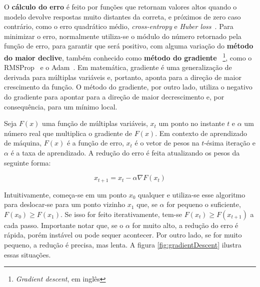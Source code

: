 O \textbf{cálculo do erro} é feito por funções que retornam valores altos quando o modelo devolve respostas muito distantes da correta, e próximos de zero caso contrário, como o erro quadrático médio, \textit{cross-entropy} e \textit{Huber loss}~\cite{huber_loss}.
Para minimizar o erro, normalmente utiliza-se o módulo do número retornado pela função de erro, para garantir que será positivo, com alguma variação do \textbf{método do maior declive}, também conhecido como \textbf{método do gradiente}~\cite{cauchy1847} \footnote{\textit{Gradient descent}, em inglês}, como o RMSProp~\cite{rmsprop} e o Adam~\cite{DBLP:journals/corr/KingmaB14}.
Em matemática, gradiente é uma generalização de derivada para múltiplas variáveis e, portanto, aponta para a direção de maior crescimento da função.
O método do gradiente, por outro lado, utiliza o negativo do gradiente para apontar para a direção de maior decrescimento e, por consequência, para um mínimo local.

Seja $F(x)$ uma função de múltiplas variáveis, $x_{t}$ um ponto no instante $t$ e $\alpha$ um número real que multiplica o gradiente de $F(x)$.
Em contexto de aprendizado de máquina, $F(x)$ é a função de erro, $x_{t}$ é o vetor de pesos na $t$-ésima iteração e $\alpha$ é a taxa de aprendizado.
A redução do erro é feita atualizando os pesos da seguinte forma:

\begin{equation} \label{eq:error_update}
x_{t+1} = x_{t} - \alpha \nabla F(x_{t})
\end{equation}

Intuitivamente, começa-se em um ponto $x_{0}$ qualquer e utiliza-se esse algoritmo para deslocar-se para um ponto vizinho $x_{1}$ que, se $\alpha$ for pequeno o suficiente, $F(x_{0}) \geq F(x_{1})$.
Se isso for feito iterativamente, tem-se $F(x_{t}) \geq F(x_{t+1})$ a cada passo.
Importante notar que, se o $\alpha$ for muito alto, a redução do erro é rápida, porém instável ou pode sequer acontecer.
Por outro lado, se for muito pequeno, a redução é precisa, mas lenta.
A figura \ref{fig:gradientDescent} ilustra essas situações.

